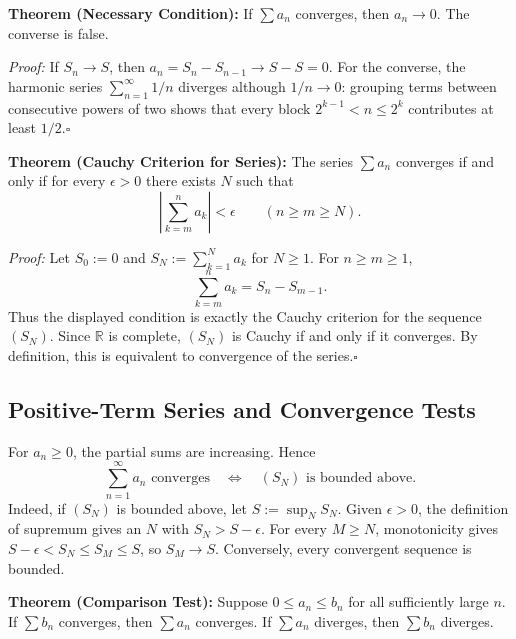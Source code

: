 \documentclass[a4paper,11pt,abstracton]{scrartcl}
\newcommand{\RR}{\mathbb{R}}
\theoremstyle{dotlessP}
\theoremstyle{dotlessS}
\theoremstyle{remark}
\theoremstyle{definition}
\begin{document}
\begin{problem_box}
\textbf{Theorem (Necessary Condition):} If $\sum a_n$ converges,
then $a_n\to0$. The converse is false.
\end{problem_box}

\begin{claim_box}
\textit{Proof:} If $S_n\to S$, then
$a_n=S_n-S_{n-1}\to S-S=0$. For the converse, the harmonic series
$\sum_{n=1}^{\infty}1/n$ diverges although $1/n\to0$: grouping terms
between consecutive powers of two shows that every block
$2^{k-1}<n\le2^k$ contributes at least $1/2$.\hfill$\square$
\end{claim_box}

\begin{problem_box}
\textbf{Theorem (Cauchy Criterion for Series):}
The series $\sum a_n$ converges if and only if for every
$\epsilon>0$ there exists $N$ such that
\[
 \left|\sum_{k=m}^n a_k\right|<\epsilon
 \qquad(n\ge m\ge N).
\]
\end{problem_box}

\begin{claim_box}
\textit{Proof:} Let $S_0:=0$ and $S_N:=\sum_{k=1}^N a_k$ for $N\ge1$.
For $n\ge m\ge1$,
\[
    \sum_{k=m}^n a_k=S_n-S_{m-1}.
\]
Thus the displayed condition is exactly the Cauchy criterion for the
sequence $(S_N)$. Since $\RR$ is complete, $(S_N)$ is Cauchy if and
only if it converges. By definition, this is equivalent to convergence
of the series.\hfill$\square$
\end{claim_box}

\subsection{Positive-Term Series and Convergence Tests}

For $a_n\ge0$, the partial sums are increasing. Hence
\[
 \sum_{n=1}^{\infty}a_n\text{ converges}
 \quad\Longleftrightarrow\quad
 (S_N)\text{ is bounded above}.
\]
Indeed, if $(S_N)$ is bounded above, let $S:=\sup_N S_N$. Given
$\epsilon>0$, the definition of supremum gives an $N$ with
$S_N>S-\epsilon$. For every $M\ge N$, monotonicity gives
$S-\epsilon<S_N\le S_M\le S$, so $S_M\to S$. Conversely, every
convergent sequence is bounded.

\begin{problem_box}
\textbf{Theorem (Comparison Test):} Suppose $0\le a_n\le b_n$ for
all sufficiently large $n$. If $\sum b_n$ converges, then
$\sum a_n$ converges. If $\sum a_n$ diverges, then $\sum b_n$
diverges.
\end{problem_box}
\end{document}
